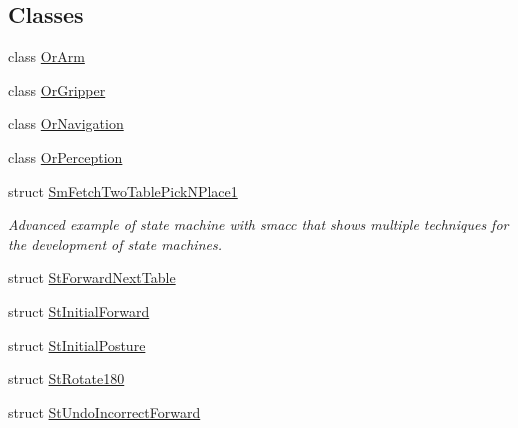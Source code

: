 \subsection*{Classes}
\begin{DoxyCompactItemize}
\item 
class \hyperlink{classsm__fetch__two__table__pick__n__place__1_1_1OrArm}{Or\+Arm}
\item 
class \hyperlink{classsm__fetch__two__table__pick__n__place__1_1_1OrGripper}{Or\+Gripper}
\item 
class \hyperlink{classsm__fetch__two__table__pick__n__place__1_1_1OrNavigation}{Or\+Navigation}
\item 
class \hyperlink{classsm__fetch__two__table__pick__n__place__1_1_1OrPerception}{Or\+Perception}
\item 
struct \hyperlink{structsm__fetch__two__table__pick__n__place__1_1_1SmFetchTwoTablePickNPlace1}{Sm\+Fetch\+Two\+Table\+Pick\+N\+Place1}
\begin{DoxyCompactList}\small\item\em Advanced example of state machine with smacc that shows multiple techniques for the development of state machines. \end{DoxyCompactList}\item 
struct \hyperlink{structsm__fetch__two__table__pick__n__place__1_1_1StForwardNextTable}{St\+Forward\+Next\+Table}
\item 
struct \hyperlink{structsm__fetch__two__table__pick__n__place__1_1_1StInitialForward}{St\+Initial\+Forward}
\item 
struct \hyperlink{structsm__fetch__two__table__pick__n__place__1_1_1StInitialPosture}{St\+Initial\+Posture}
\item 
struct \hyperlink{structsm__fetch__two__table__pick__n__place__1_1_1StRotate180}{St\+Rotate180}
\item 
struct \hyperlink{structsm__fetch__two__table__pick__n__place__1_1_1StUndoIncorrectForward}{St\+Undo\+Incorrect\+Forward}
\end{DoxyCompactItemize}
